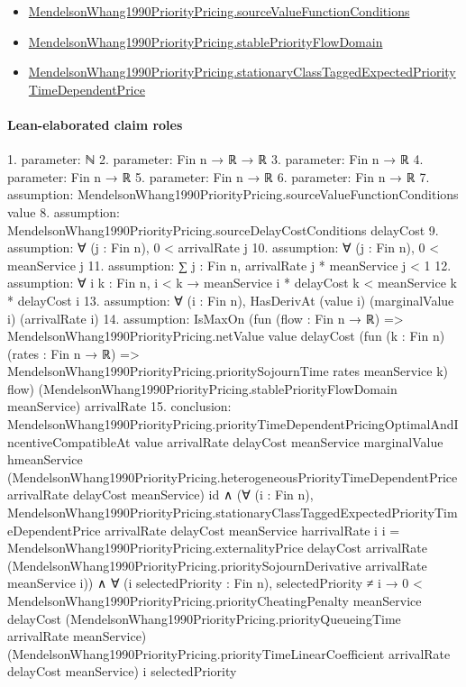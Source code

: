 \documentclass[10pt]{article}
\begin{document}
\begin{itemize}
\item \hyperlink{paper-prerequisite-9c435671d506207c}{Mendelson\allowbreak{}Whang1990\allowbreak{}Priority\allowbreak{}Pricing.\allowbreak{}source\allowbreak{}Value\allowbreak{}Function\allowbreak{}Conditions}
\item \hyperlink{paper-prerequisite-84dca75fd93aa845}{Mendelson\allowbreak{}Whang1990\allowbreak{}Priority\allowbreak{}Pricing.\allowbreak{}stable\allowbreak{}Priority\allowbreak{}Flow\allowbreak{}Domain}
\item \hyperlink{paper-prerequisite-816477dc3af70c36}{Mendelson\allowbreak{}Whang1990\allowbreak{}Priority\allowbreak{}Pricing.\allowbreak{}stationary\allowbreak{}Class\allowbreak{}Tagged\allowbreak{}Expected\allowbreak{}Priority\allowbreak{}Time\allowbreak{}Dependent\allowbreak{}Price}
\end{itemize}
\paragraph{Lean-elaborated claim roles}\begin{ReviewVerbatim}
1. parameter: ℕ
2. parameter: Fin n → ℝ → ℝ
3. parameter: Fin n → ℝ
4. parameter: Fin n → ℝ
5. parameter: Fin n → ℝ
6. parameter: Fin n → ℝ
7. assumption: MendelsonWhang1990PriorityPricing.sourceValueFunctionConditions value
8. assumption: MendelsonWhang1990PriorityPricing.sourceDelayCostConditions delayCost
9. assumption: ∀ (j : Fin n), 0 < arrivalRate j
10. assumption: ∀ (j : Fin n), 0 < meanService j
11. assumption: ∑ j : Fin n, arrivalRate j * meanService j < 1
12. assumption: ∀ {i k : Fin n}, i < k → meanService i * delayCost k < meanService k * delayCost i
13. assumption: ∀ (i : Fin n), HasDerivAt (value i) (marginalValue i) (arrivalRate i)
14. assumption: IsMaxOn
  (fun (flow : Fin n → ℝ) =>
    MendelsonWhang1990PriorityPricing.netValue value delayCost
      (fun (k : Fin n) (rates : Fin n → ℝ) => MendelsonWhang1990PriorityPricing.prioritySojournTime rates meanService k)
      flow)
  (MendelsonWhang1990PriorityPricing.stablePriorityFlowDomain meanService) arrivalRate
15. conclusion: MendelsonWhang1990PriorityPricing.priorityTimeDependentPricingOptimalAndIncentiveCompatibleAt value arrivalRate
    delayCost meanService marginalValue hmeanService
    (MendelsonWhang1990PriorityPricing.heterogeneousPriorityTimeDependentPrice arrivalRate delayCost meanService) id ∧
  (∀ (i : Fin n),
      MendelsonWhang1990PriorityPricing.stationaryClassTaggedExpectedPriorityTimeDependentPrice arrivalRate delayCost
          meanService harrivalRate i i =
        MendelsonWhang1990PriorityPricing.externalityPrice delayCost arrivalRate
          (MendelsonWhang1990PriorityPricing.prioritySojournDerivative arrivalRate meanService i)) ∧
    ∀ (i selectedPriority : Fin n),
      selectedPriority ≠ i →
        0 <
          MendelsonWhang1990PriorityPricing.priorityCheatingPenalty meanService delayCost
            (MendelsonWhang1990PriorityPricing.priorityQueueingTime arrivalRate meanService)
            (MendelsonWhang1990PriorityPricing.priorityTimeLinearCoefficient arrivalRate delayCost meanService) i
            selectedPriority
\end{ReviewVerbatim}
\end{document}
